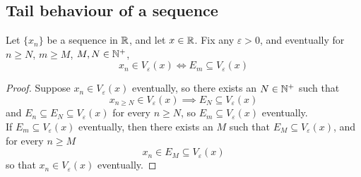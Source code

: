 \documentclass[../../main.tex]{subfiles}
\begin{document}
\providecommand{\xn}{\{x_n\}}
\subsection{Tail behaviour of a sequence}
\begin{wts}\label{lemma:tail behaviour of a sequence}
    Let $\xn$ be a sequence in $\mathbb{R}$, and let $x\in\mathbb{R}$. Fix any $\varepsilon>0$, and eventually for $n\geq N$, $m\geq M$, $M,N\in\mathbb{N}^+$,
    \[x_n\in V_\varepsilon(x)\iff E_m\subseteq V_\varepsilon(x)\]
\end{wts}
\begin{proof}
    Suppose $x_n\in V_\varepsilon(x)$ eventually, so there exists an $N\in\mathbb{N}^+$ such that
    \[
    x_{n\geq N}\in V_\varepsilon(x)\implies E_N\subseteq V_\varepsilon(x)
    \]
    and $E_n\subseteq E_N\subseteq V_\varepsilon(x)$ for every $n\geq N$, so $E_m\subseteq V_\varepsilon(x)$ eventually.\\
    
    If $E_m\subseteq V_\varepsilon(x)$ eventually, then there exists an $M$ such that $E_M\subseteq V_\varepsilon(x)$, and for every $n\geq M$
    \[
    x_n\in E_M\subseteq V_\varepsilon(x)
    \]
    so that $x_n\in V_\varepsilon(x)$ eventually.
\end{proof}
\end{document}
